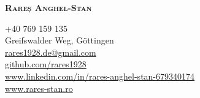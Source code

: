 \documentclass[a4paper, 11pt]{article}
\begin{document}

\begin{minipage}[c]{0.35\textwidth}
\hfill\vline\hfill
\end{minipage}
\begin{minipage}[c]{0.6\textwidth}
    \textbf{\LARGE \scshape{Rareș Anghel-Stan}} \\ \vspace{1pt} 
    
	+40 769 159 135\\
    Greifswalder Weg, G\" ottingen\\
    \href{mailto:rares1928.de@gmail.com}{rares1928.de@gmail.com}\\
    \href{https://github.com/rares1928}{github.com/rares1928} \\
    \href{https://www.linkedin.com/in/rares-anghel-stan-679340174/}{www.linkedin.com/in/rares-anghel-stan-679340174} \\
    \href{https://www.rares-stan.ro/}{www.rares-stan.ro}
\end{minipage}

\end{document}
